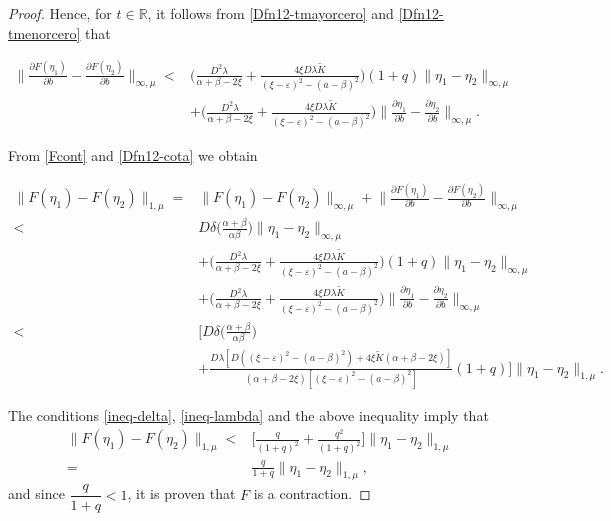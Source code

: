 \documentclass[10pt,a4paper]{amsart}
\begin{document}
\begin{proof}
Hence, for $t\in\mathbb{R}$, it follows from \eqref{Dfn12-tmayorcero} and \eqref{Dfn12-tmenorcero} that 

\begin{align}
    \Big\|\frac{\partial F(\eta_1)}{\partial b} - \frac{\partial F(\eta_2)}{\partial b}\Big\|_{\infty,\mu} <& \Big(\frac{D^2\lambda}{\alpha+\beta-2\xi}+\frac{4\xi D\lambda\tilde{K}}{(\xi-\varepsilon)^2-(a-\beta)^2}\Big)(1+q)\|\eta_1-\eta_2\|_{\infty,\mu}\nonumber\\
    & + \Big(\frac{D^2\lambda}{\alpha+\beta-2\xi}+\frac{4\xi D\lambda\tilde{K}}{(\xi-\varepsilon)^2-(a-\beta)^2}\Big)\Big\|\frac{\partial \eta_1}{\partial b} - \frac{\partial\eta_2}{\partial b}\Big\|_{\infty,\mu}.\label{Dfn12-cota}
\end{align}

From \eqref{Fcont} and \eqref{Dfn12-cota} we obtain

\begin{align*}
    \|F(\eta_1)-F(\eta_2)\|_{1,\mu} = & \|F(\eta_1)-F(\eta_2)\|_{\infty,\mu} + \Big\|\frac{\partial F(\eta_1)}{\partial b} - \frac{\partial F(\eta_2)}{\partial b}\Big\|_{\infty,\mu}\nonumber\\
    <& D\delta\Big(\frac{\alpha+\beta}{\alpha\beta}\Big)\|\eta_1-\eta_2\|_{\infty,\mu}\nonumber\\
    &+ \Big(\frac{D^2\lambda}{\alpha+\beta-2\xi}+\frac{4\xi D\lambda\tilde{K}}{(\xi-\varepsilon)^2-(a-\beta)^2}\Big)(1+q)\|\eta_1-\eta_2\|_{\infty,\mu}\nonumber\\
    &+  \Big(\frac{D^2\lambda}{\alpha+\beta-2\xi}+\frac{4\xi D\lambda\tilde{K}}{(\xi-\varepsilon)^2-(a-\beta)^2}\Big)\Big\|\frac{\partial \eta_1}{\partial b} - \frac{\partial\eta_2}{\partial b}\Big\|_{\infty,\mu}\nonumber\\
    <& \Big[D\delta\Big(\frac{\alpha+\beta}{\alpha\beta}\Big)\nonumber\\
    &+ \frac{D\lambda[D((\xi-\varepsilon)^2-(a-\beta)^2)+4\xi\tilde{K}(\alpha+\beta-2\xi)]}{(\alpha+\beta-2\xi)[(\xi-\varepsilon)^2-(a-\beta)^2]}(1+q)\Big]\|\eta_1-\eta_2\|_{1,\mu}.
\end{align*}

The conditions \eqref{ineq-delta}, \eqref{ineq-lambda} and the above inequality imply that
\begin{align*}
   \|F(\eta_1)-F(\eta_2)\|_{1,\mu} < & \Big[\frac{q}{(1+q)^2}+\frac{q^2}{(1+q)^2}\Big]\|\eta_1-\eta_2\|_{1,\mu}\\
   =& \frac{q}{1+q}\|\eta_1-\eta_2\|_{1,\mu},
\end{align*}
 and since $\dfrac{q}{1+q}<1$, it is proven that $F$ is a contraction.
\end{proof}
\end{document}

